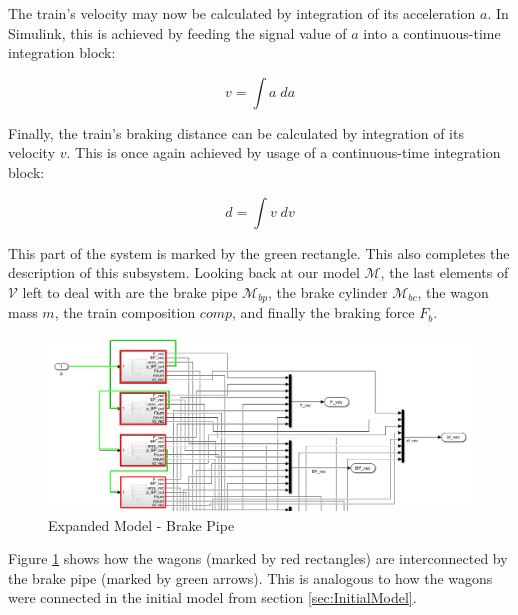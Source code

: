 \noindent
The train's velocity may now be calculated by integration of its acceleration $a$. In Simulink, this is achieved by feeding the signal value of $a$ into a continuous-time integration block:

\begin{equation}
\label{eq:velocity}
v = \int a \; da
\end{equation}

\noindent
Finally, the train's braking distance can be calculated by integration of its velocity $v$. This is once again achieved by usage of a continuous-time integration block:

\begin{equation}
\label{eq:distance}
d = \int v \; dv
\end{equation}

\noindent
This part of the system is marked by the green rectangle. This also completes the description of this subsystem. Looking back at our model ${\mathcal{M}}$, the last elements of ${\mathcal{V}}$ left to deal with are the brake pipe ${\mathcal{M}}_{bp}$, the brake cylinder ${\mathcal{M}}_{bc}$, the wagon mass $m$, the train composition $comp$, and finally the braking force $F_{b}$.

\begin{figure}[htb!]
	\centering
	\includegraphics[width=\linewidth]{./pic/expandedmodel_brakepipe}
	\caption{Expanded Model - Brake Pipe}
	\label{fig:expandedmodel_brakepipe}
\end{figure}

\par\noindent
Figure \ref{fig:expandedmodel_brakepipe} shows how the wagons (marked by red rectangles) are interconnected by the brake pipe (marked by green arrows). This is analogous to how the wagons were connected in the initial model from section \ref{sec:InitialModel}.  

